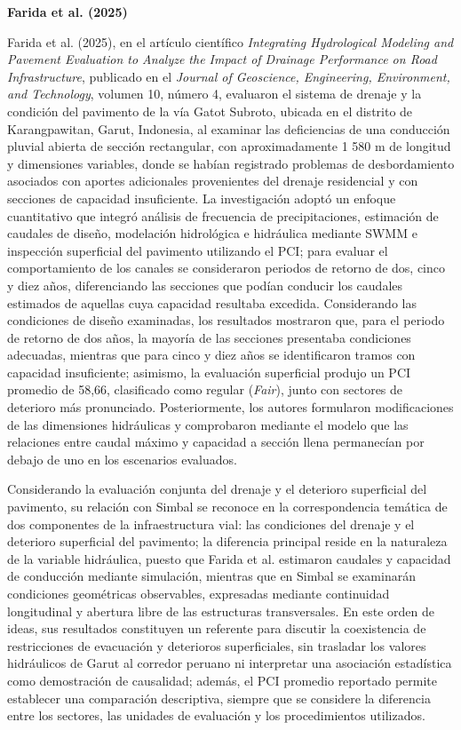 \noindent\textbf{Farida et al. (2025)}

Farida et al. (2025), en el artículo científico \textit{Integrating Hydrological Modeling and Pavement Evaluation to Analyze the Impact of Drainage Performance on Road Infrastructure}, publicado en el \textit{Journal of Geoscience, Engineering, Environment, and Technology}, volumen 10, número 4, evaluaron el sistema de drenaje y la condición del pavimento de la vía Gatot Subroto, ubicada en el distrito de Karangpawitan, Garut, Indonesia, al examinar las deficiencias de una conducción pluvial abierta de sección rectangular, con aproximadamente 1 580 m de longitud y dimensiones variables, donde se habían registrado problemas de desbordamiento asociados con aportes adicionales provenientes del drenaje residencial y con secciones de capacidad insuficiente. La investigación adoptó un enfoque cuantitativo que integró análisis de frecuencia de precipitaciones, estimación de caudales de diseño, modelación hidrológica e hidráulica mediante SWMM e inspección superficial del pavimento utilizando el PCI; para evaluar el comportamiento de los canales se consideraron periodos de retorno de dos, cinco y diez años, diferenciando las secciones que podían conducir los caudales estimados de aquellas cuya capacidad resultaba excedida. Considerando las condiciones de diseño examinadas, los resultados mostraron que, para el periodo de retorno de dos años, la mayoría de las secciones presentaba condiciones adecuadas, mientras que para cinco y diez años se identificaron tramos con capacidad insuficiente; asimismo, la evaluación superficial produjo un PCI promedio de 58,66, clasificado como regular (\textit{Fair}), junto con sectores de deterioro más pronunciado. Posteriormente, los autores formularon modificaciones de las dimensiones hidráulicas y comprobaron mediante el modelo que las relaciones entre caudal máximo y capacidad a sección llena permanecían por debajo de uno en los escenarios evaluados.

Considerando la evaluación conjunta del drenaje y el deterioro superficial del pavimento, su relación con Simbal se reconoce en la correspondencia temática de dos componentes de la infraestructura vial: las condiciones del drenaje y el deterioro superficial del pavimento; la diferencia principal reside en la naturaleza de la variable hidráulica, puesto que Farida et al. estimaron caudales y capacidad de conducción mediante simulación, mientras que en Simbal se examinarán condiciones geométricas observables, expresadas mediante continuidad longitudinal y abertura libre de las estructuras transversales. En este orden de ideas, sus resultados constituyen un referente para discutir la coexistencia de restricciones de evacuación y deterioros superficiales, sin trasladar los valores hidráulicos de Garut al corredor peruano ni interpretar una asociación estadística como demostración de causalidad; además, el PCI promedio reportado permite establecer una comparación descriptiva, siempre que se considere la diferencia entre los sectores, las unidades de evaluación y los procedimientos utilizados.

